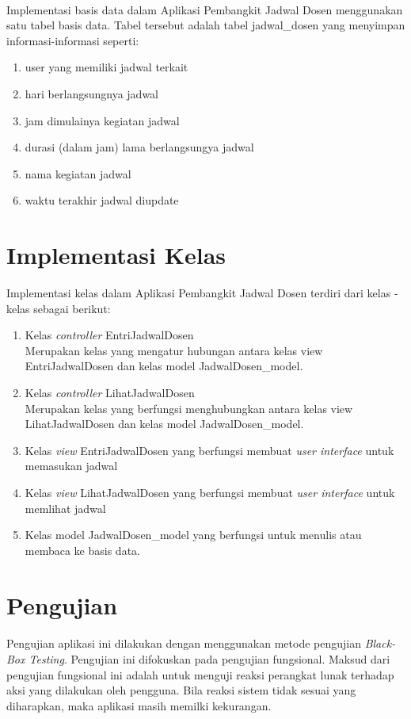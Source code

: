 \paragraph{}Implementasi basis data dalam Aplikasi Pembangkit Jadwal Dosen menggunakan satu tabel basis data. Tabel tersebut adalah tabel jadwal\_dosen yang menyimpan informasi-informasi seperti:
\begin{enumerate}
	\item user yang memiliki jadwal terkait
	\item hari berlangsungnya jadwal
	\item jam dimulainya kegiatan jadwal 
	\item durasi (dalam jam) lama berlangsungya jadwal
	\item nama kegiatan jadwal
	\item waktu terakhir jadwal diupdate
\end{enumerate}

\section{Implementasi Kelas}
Implementasi kelas dalam Aplikasi Pembangkit Jadwal Dosen terdiri dari kelas - kelas sebagai berikut:
\begin{enumerate}
	\item Kelas \textit{controller} EntriJadwalDosen\\
	Merupakan kelas yang mengatur hubungan antara kelas view EntriJadwalDosen dan kelas model JadwalDosen\_model.
	\item Kelas \textit{controller} LihatJadwalDosen\\
	Merupakan kelas yang berfungsi menghubungkan antara kelas view LihatJadwalDosen dan kelas model JadwalDosen\_model.
	\item Kelas \textit{view} EntriJadwalDosen yang berfungsi membuat \textit{user interface} untuk memasukan jadwal
	\item Kelas \textit{view} LihatJadwalDosen yang berfungsi membuat \textit{user interface} untuk memlihat jadwal
	\item Kelas model JadwalDosen\_model yang berfungsi untuk menulis atau membaca ke basis data.
\end{enumerate}

\section{Pengujian}
\paragraph{} Pengujian aplikasi ini dilakukan dengan menggunakan metode pengujian \textit{Black-Box Testing}. Pengujian ini difokuskan pada pengujian fungsional. Maksud dari pengujian fungsional ini adalah untuk menguji reaksi perangkat lunak terhadap aksi yang dilakukan oleh pengguna. Bila reaksi sistem tidak sesuai yang diharapkan, maka aplikasi masih memilki kekurangan.

